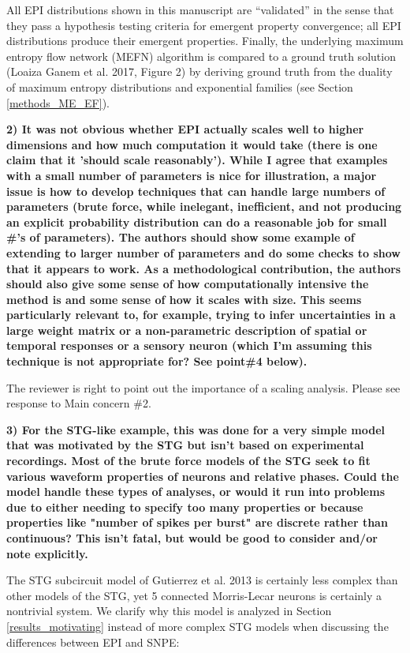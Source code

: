 \documentclass[11pt,a4paper]{article}
\begin{document}
All EPI distributions shown in this manuscript are “validated” in the sense that they pass a hypothesis testing criteria for emergent property convergence; all EPI distributions produce their emergent properties.
Finally, the underlying maximum entropy flow network (MEFN) algorithm is compared to a ground truth solution (Loaiza Ganem et al. 2017, Figure 2) by deriving ground truth from the duality of maximum entropy distributions and exponential families (see Section \ref{methods_ME_EF}).

\textbf{2) It was not obvious whether EPI actually scales well to higher dimensions and how much computation it would take (there is one claim that it 'should scale reasonably'). While I agree that examples with a small number of parameters is nice for illustration, a major issue is how to develop techniques that can handle large numbers of parameters (brute force, while inelegant, inefficient, and not producing an explicit probability distribution can do a reasonable job for small \#'s of parameters). The authors should show some example of extending to larger number of parameters and do some checks to show that it appears to work. As a methodological contribution, the authors should also give some sense of how computationally intensive the method is and some sense of how it scales with size. This seems particularly relevant to, for example, trying to infer uncertainties in a large weight matrix or a non-parametric description of spatial or temporal responses or a sensory neuron (which I'm assuming this technique is not appropriate for? See point\#4 below). }

The reviewer is right to point out the importance of a scaling analysis. Please see response to Main concern \#2.

\textbf{3) For the STG-like example, this was done for a very simple model that was motivated by the STG but isn't based on experimental recordings. Most of the brute force models of the STG seek to fit various waveform properties of neurons and relative phases. Could the model handle these types of analyses, or would it run into problems due to either needing to specify too many properties or because properties like "number of spikes per burst" are discrete rather than continuous? This isn't fatal, but would be good to consider and/or note explicitly. }

The STG subcircuit model of Gutierrez et al. 2013 is certainly less complex than other models of the STG, yet 5 connected Morris-Lecar neurons is certainly a nontrivial system.
We clarify why this model is analyzed in Section \ref{results_motivating} instead of more complex STG models when discussing the differences between EPI and SNPE:
\end{document}
